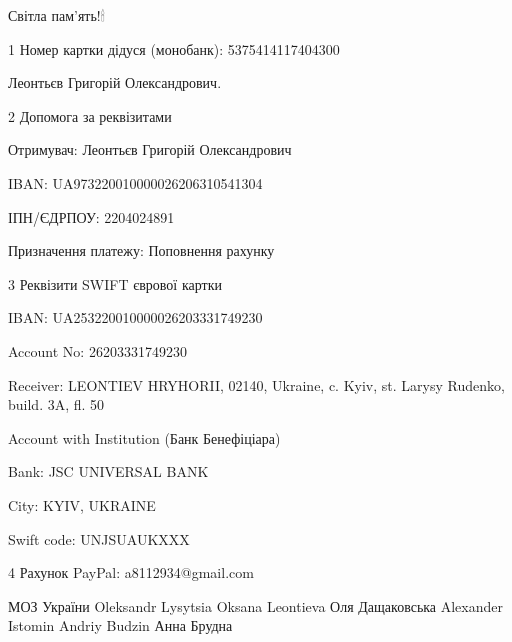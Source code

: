 Світла пам'ять!🕯

1 Номер картки дідуся (монобанк): 5375414117404300 

Леонтьєв Григорій Олександрович.

2 Допомога за реквізитами

Отримувач: Леонтьєв Григорій Олександрович \par
IBAN: UA973220010000026206310541304 \par
ІПН/ЄДРПОУ: 2204024891 \par
Призначення платежу: Поповнення рахунку\par
3 Реквізити SWIFT єврової картки\par
IBAN: UA253220010000026203331749230 \par
Account No: 26203331749230 \par
Receiver: LEONTIEV HRYHORII, 02140, Ukraine, c. Kyiv, st. Larysy Rudenko, build. 3A, fl. 50 \par
Account with Institution (Банк Бенефіціара)\par
Bank: JSC UNIVERSAL BANK \par
City: KYIV, UKRAINE \par
Swift code: UNJSUAUKXXX\par
4 Рахунок PayPal: a8112934@gmail.com\par

МОЗ України Oleksandr Lysytsia Oksana Leontieva Оля Дащаковська Alexander
Istomin Andriy  Budzin Анна Брудна

